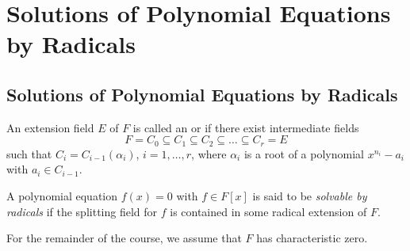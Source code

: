 \section{Solutions of Polynomial Equations by Radicals}
\subsection{Solutions of Polynomial Equations by Radicals}
\begin{definition}
	An extension field $E$ of $F$ is called an  or  if there exist intermediate fields
	\begin{equation}\label{eq:tower-8}
		F = C_0 \subseteq C_1 \subseteq C_2 \subseteq \dots \subseteq C_r = E
	\end{equation}
	such that $C_i = C_{i - 1}(\alpha_i)$, $i = 1, \dots, r$, where $\alpha_i$ is a root of a polynomial $x^{n_i} - a_i$ with $a_i \in C_{i - 1}$.
	
	A polynomial equation $f(x) = 0$ with $f \in F[x]$ is said to be \emph{solvable by radicals} if the splitting field for $f$ is contained in some radical extension of $F$.
\end{definition}

For the remainder of the course, we assume that $F$ has characteristic zero.

